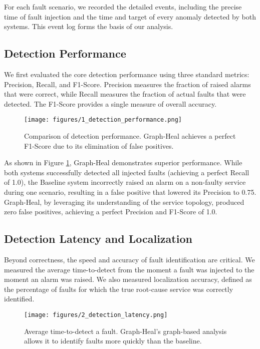 \documentclass[11pt,conference]{IEEEtran}
\begin{document}
For each fault scenario, we recorded the detailed events, including the precise time of fault injection and the time and target of every anomaly detected by both systems. This event log forms the basis of our analysis.

\subsection{Detection Performance}
We first evaluated the core detection performance using three standard metrics: Precision, Recall, and F1-Score. Precision measures the fraction of raised alarms that were correct, while Recall measures the fraction of actual faults that were detected. The F1-Score provides a single measure of overall accuracy.

\begin{figure}[ht]
  \centering
  \texttt{[image: figures/1\_detection\_performance.png]}
  \caption{Comparison of detection performance. Graph-Heal achieves a perfect F1-Score due to its elimination of false positives.}
  \label{fig:detection-performance}
\end{figure}

As shown in Figure \ref{fig:detection-performance}, Graph-Heal demonstrates superior performance. While both systems successfully detected all injected faults (achieving a perfect Recall of 1.0), the Baseline system incorrectly raised an alarm on a non-faulty service during one scenario, resulting in a false positive that lowered its Precision to 0.75. Graph-Heal, by leveraging its understanding of the service topology, produced zero false positives, achieving a perfect Precision and F1-Score of 1.0.

\subsection{Detection Latency and Localization}
Beyond correctness, the speed and accuracy of fault identification are critical. We measured the average time-to-detect from the moment a fault was injected to the moment an alarm was raised. We also measured localization accuracy, defined as the percentage of faults for which the true root-cause service was correctly identified.

\begin{figure}[ht]
  \centering
  \texttt{[image: figures/2\_detection\_latency.png]}
  \caption{Average time-to-detect a fault. Graph-Heal's graph-based analysis allows it to identify faults more quickly than the baseline.}
  \label{fig:detection-latency}
\end{figure}
\end{document}
